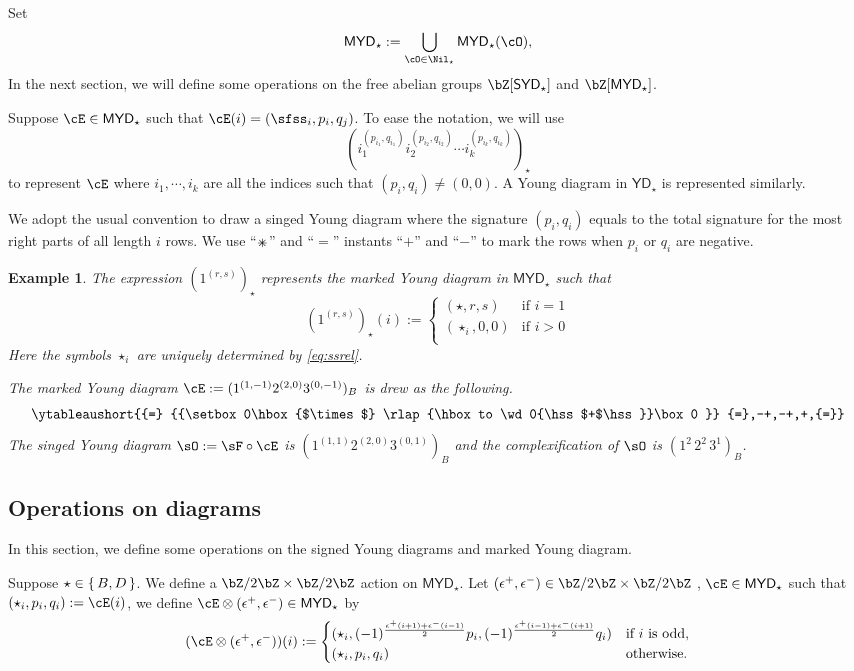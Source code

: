 \documentclass[12pt,a4paper]{amsart}
\def\YD{{\mathsf{YD}}}
\def\SYD{{\mathsf{SYD}}}
\def\MYD{{\mathsf{MYD}}}
\numberwithin{equation}{section}
\newtheorem{eg}[thm]{Example}
\theoremstyle{remark}
\let\ytb=\ytableaushort
\def\umm{{=}}
\def\upp{{\ast}}
\def\upp{
  {{\setbox0\hbox{$\times$}
      \rlap{\hbox to \wd0{\hss$+$\hss}}\box0
    }}
}
\begin{document}
Set
\[
  \MYD_{\star} := \bigcup_{\cO\in \Nil_{\star}}\MYD_{\star}(\cO),
\]
In the next section, we will define some operations on the  free abelian groups
$\bZ[\SYD_{\star}]$ and $\bZ[\MYD_{\star}]$.

\smallskip

Suppose $\cE\in \MYD_{\star}$ such that $\cE(i)=(\sfss_{i},p_{i},q_{j})$.
To ease the notation, we will use
\[
  ( i_{1}^{(p_{i_{1}},q_{i_{1}})}i_{2}^{(p_{i_{2}},q_{i_{2}})}\cdots i_{k}^{(p_{i_{k}},q_{i_{k}})} )_{\star}
\]
to represent $\cE$ where
$i_{1},\cdots, i_{k}$ are all the indices such that $(p_{i},q_{i})\neq (0,0)$.
A Young diagram in $\YD_{\star}$ is represented similarly.

We adopt the usual convention to draw a singed Young diagram where the signature
$(p_{i}, q_{i})$ equals to the total signature for the most right parts of all
length $i$ rows.
We use ``$\upp$'' and ``$\umm$'' instants ``$+$'' and ``$-$'' to mark the rows
when $p_{i}$ or $q_{i}$ are negative.

\begin{eg}\label{eg:MYD}
The expression $(1^{(r,s)})_{\star}$ represents the marked Young diagram in $\MYD_{\star}$ such that
 \[
   (1^{(r,s)})_{\star}(i) := \begin{cases}
     (\star,r,s) & \text{if } i=1\\
     (\star_{i},0,0) & \text{if $i>0$}\\
   \end{cases}
 \]
 Here the symbols $\star_{i}$ are uniquely determined by \eqref{eq:ssrel}.

The marked Young diagram  $\cE:=(1^{(1,-1)}2^{(2,0)}3^{(0,-1)})_{B}$ is drew as the
following.
\[
  \ytb{\umm\upp\umm,-+,-+,+,\umm}
\]
The singed Young diagram $\sO:=\sF\circ \cE$ is
$(1^{(1,1)}2^{(2,0)}3^{(0,1)})_{B}$ and the complexification of $\sO$
is $(1^{2}\,2^{2}\,3^{1})_{B}$.
\end{eg}

\subsection{Operations on diagrams}
In this section, we define some operations on the signed Young diagrams and
marked Young diagram.

Suppose $\star\in \set{B,D}$.
We define a $\bZ/2\bZ\times \bZ/2\bZ$ action on $\MYD_{\star}$.
Let $(\epsilon^{+},\epsilon^{-})\in \bZ/2\bZ\times \bZ/2\bZ$ , $\cE\in \MYD_{\star}$ such that $(\star_{i},p_{i},q_{i}):=\cE(i)$,
we define $\cE \lotimes (\epsilon^{+},\epsilon^{-})\in \MYD_{\star}$ by
\[
(\cE \lotimes(\epsilon^{+},\epsilon^{-}))(i) := \begin{cases}
  (\star_{i}, (-1)^{\frac{\epsilon^{+}(i+1)+\epsilon^{-}(i-1)}{2}}p_{i},(-1)^{\frac{\epsilon^{+}(i-1)+\epsilon^{-}(i+1)}{2}}q_{i})
  & \text{if $i$  is odd,}\\
  (\star_{i}, p_{i},q_{i}) & \text{otherwise.}
\end{cases}
\]
\end{document}
